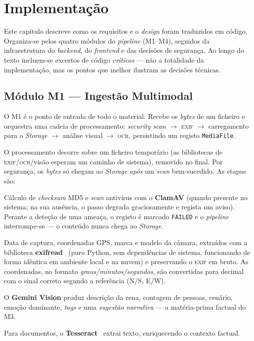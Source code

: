 \chapter{Implementação}
\label{cap:implementacao}

Este capítulo descreve como os requisitos e o \emph{design} foram
traduzidos em código. Organiza-se pelos quatro módulos do \emph{pipeline}
(M1--M4), seguidos da infraestrutura do \emph{backend}, do \emph{frontend}
e das decisões de segurança. Ao longo do texto incluem-se excertos de
código \emph{críticos} — não a totalidade da implementação, mas os pontos
que melhor ilustram as decisões técnicas.

\section{Módulo M1 --- Ingestão Multimodal}
\label{sec:impl_m1}

O M1 é o ponto de entrada de todo o material. Recebe os \emph{bytes} de um
ficheiro e orquestra uma cadeia de processamento: \emph{security scan}
$\rightarrow$ \textsc{exif} $\rightarrow$ carregamento para o \emph{Storage}
$\rightarrow$ análise visual $\rightarrow$ \textsc{ocr}, persistindo um
registo \texttt{MediaFile}.

O processamento decorre sobre um ficheiro temporário (as bibliotecas de
\textsc{exif}/\textsc{ocr}/visão esperam um caminho de sistema), removido no
final. Por segurança, os \emph{bytes} só chegam ao \emph{Storage} \emph{após}
um \emph{scan} bem-sucedido. As etapas são:

\begin{description}[leftmargin=*]
  \item[\emph{Security scan}.] Cálculo de \emph{checksum} MD5 e \emph{scan}
  antivírus com o \textbf{ClamAV} (quando presente no sistema; na sua
  ausência, o passo degrada graciosamente e regista um aviso). Perante a
  deteção de uma ameaça, o registo é marcado \texttt{FAILED} e o
  \emph{pipeline} interrompe-se --- o conteúdo nunca chega ao \emph{Storage}.
  \item[\textsc{exif}.] Data de captura, coordenadas GPS, marca e modelo
  da câmara, extraídos com a biblioteca \textbf{exifread}~\cite{exifread} (puro Python, sem
  dependências de sistema, funcionando de forma idêntica em ambiente local
  e na nuvem) e preservando o \textsc{exif} em bruto. As coordenadas, no
  formato \emph{graus/minutos/segundos}, são convertidas para decimal com o
  sinal correto segundo a referência (N/S, E/W).
  \item[Análise visual.] O \textbf{Gemini Vision} produz descrição da
  cena, contagem de pessoas, cenário, emoção dominante, \emph{tags} e uma
  \emph{sugestão narrativa} — a matéria-prima factual do M3.
  \item[\textsc{ocr}.] Para documentos, o \textbf{Tesseract}~\cite{smith2007tesseract} extrai
  texto, enriquecendo o contexto factual.
\end{description}

